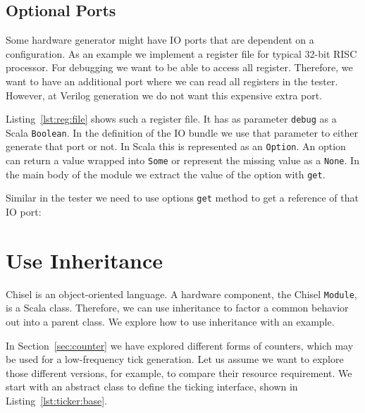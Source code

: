 \documentclass[%
    10pt,
    headinclude, footexclude,
    openright, %
    notitlepage,
    cleardoubleempty,
    headsepline,
    pointlessnumbers,
    bibtotoc, idxtotoc,
    ]{scrbook}
\newcommand{\code}[1]{{\lstinline[basicstyle=\small\ttfamily]{#1}}}
\begin{document}

\subsection{Optional Ports}

Some hardware generator might have IO ports that are dependent on a configuration.
As an example we implement a register file for typical 32-bit RISC processor. For debugging
we want to be able to access all register. Therefore, we want to have an additional
port where we can read all registers in the tester. However, at Verilog generation
we do not want this expensive extra port.

Listing~\ref{lst:reg:file} shows such a register file. It has as parameter \code{debug}
as a Scala \code{Boolean}. In the definition of the IO bundle we use that parameter
to either generate that port or not. In Scala this is represented as an \code{Option}.
An option can return a value wrapped into \code{Some} or represent the missing value
as a \code{None}. In the main body of the module we extract the value of the option
with \code{get}.


Similar in the tester we need to  use options \code{get} method to get a reference
of that IO port:



\section{Use Inheritance}
\label{sec:inheritance}


Chisel is an object-oriented language. A hardware component, the Chisel \code{Module},
is a Scala class. Therefore, we can use inheritance to factor a common behavior
out into a parent class. We explore how to use inheritance with an example.

In Section~\ref{sec:counter} we have explored different forms of counters,
which may be used for a low-frequency tick generation. Let us assume we want to
explore those different versions, for example, to compare their resource requirement.
We start with an abstract class to define the ticking interface, shown in Listing~\ref{lst:ticker:base}.

\end{document}
